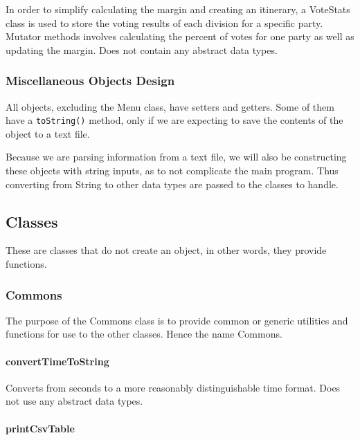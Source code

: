 \documentclass[a4paper, 12pt, titlepage]{article}
\newcommand{\code}[1]{\small\texttt{#1}\normalsize}
\begin{document}
In order to simplify calculating the margin and creating an itinerary, a
VoteStats class is used to store the voting results of each division for
a specific party. Mutator methods involves calculating the percent of votes
for one party as well as updating the margin. Does not contain any abstract
data types.

\subsubsection{Miscellaneous Objects Design}

All objects, excluding the Menu class, have setters and getters. Some of them
have a \code{toString()} method, only if we are expecting to save the contents
of the object to a text file.

Because we are parsing information from a text file, we will also be
constructing these objects with string inputs, as to not complicate
the main program. Thus converting from String to other data types are passed
to the classes to handle.

\newpage

\subsection{Classes}

These are classes that do not create an object, in other words, they provide
functions.

\subsubsection{Commons}

The purpose of the Commons class is to provide common or generic utilities
and functions for use to the other classes. Hence the name Commons.

\paragraph{convertTimeToString} \hspace{0pt}

Converts from seconds to a more reasonably distinguishable time format.
Does not use any abstract data types.

\paragraph{printCsvTable} \hspace{0pt}
\end{document}
